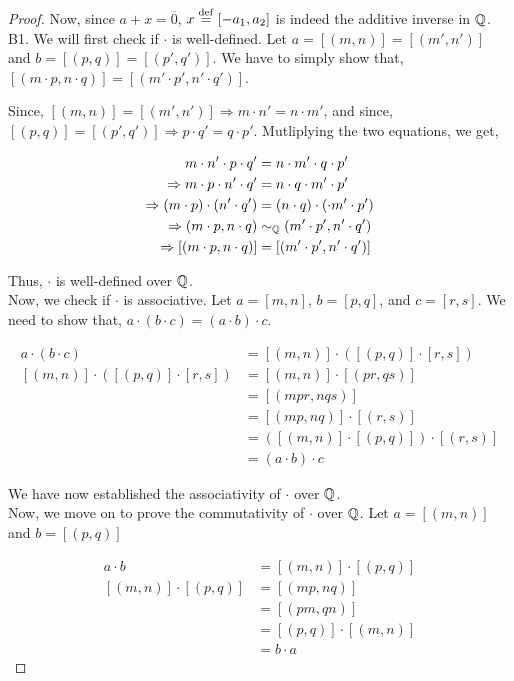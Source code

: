 \documentclass[11pt]{scrartcl}
\begin{document}
\begin{proof}
	Now, since $a+x = \overline{0}$, $x \overset{\mathrm{def}}{=} [-a_{1}, a_{2}]$ is indeed the additive inverse in $\mathbb Q$.\\[2pt]
	
	B1. We will first check if $\cdot$ is well-defined. Let $a = [(m,n)] = [(m',n')]$ and $b = [(p,q)] = [(p',q')]$. We have to simply show that, $[(m\cdot p, n \cdot q)] = [(m' \cdot p', n' \cdot q')]$.
	
	Since, $[(m,n)] = [(m',n')] \Rightarrow m\cdot n' = n\cdot m'$, and since, $[(p,q)] = [(p',q')] \Rightarrow p \cdot q' = q \cdot p'$. Mutliplying the two equations, we get,
	
	\begin{align*}
		m\cdot n' \cdot p \cdot q' &= n \cdot m' \cdot q \cdot p'\\
		\Rightarrow m \cdot p \cdot n' \cdot q' &= n \cdot q \cdot m' \cdot p'\\
		\Rightarrow (m \cdot p)\cdot(  n' \cdot q') &= (n \cdot q)\cdot( \cdot m' \cdot p')\\
		\Rightarrow (m\cdot p, n\cdot q) &\sim_{\mathbb Q} (m' \cdot p', n' \cdot q')\\
		\Rightarrow [(m\cdot p, n\cdot q)] &= [(m' \cdot p', n' \cdot q')]
	\end{align*}
	
	Thus, $\cdot$ is well-defined over $\mathbb Q$.\\[2pt]
	
	Now, we check if $\cdot$ is associative. Let $a=[m,n]$, $b=[p,q]$, and $c=[r,s]$. We need to show that, $a\cdot (b \cdot c) = (a \cdot b)\cdot c$.
	
	\begin{align*}
		a\cdot (b \cdot c) &= [(m,n)] \cdot ([(p,q)]\cdot [r,s])\\
		[(m,n)] \cdot ([(p,q)]\cdot [r,s]) &= [(m,n)] \cdot [(pr, qs)]\\
		&= [(mpr, nqs)]\\
		&= [(mp, nq)] \cdot [(r,s)]\\
		&= ([(m,n)] \cdot [(p,q)]) \cdot [(r,s)]\\
		&= (a \cdot b) \cdot c
	\end{align*}

	We have now established the associativity of $\cdot$ over $\mathbb Q$.\\[2pt]
	
	Now, we move on to prove the commutativity of $\cdot$ over $\mathbb Q$. Let $a=[(m,n)]$ and $b=[(p,q)]$
	
	\begin{align*}
		a \cdot b &= [(m,n)] \cdot [(p,q)]\\
		[(m,n)] \cdot [(p,q)] &= [(mp, nq)]\\
		&= [(pm, qn)]\\
		&= [(p,q)] \cdot [(m,n)]\\
		&= b \cdot a
	\end{align*}


\end{proof}
\end{document}
